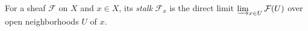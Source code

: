 
For a sheaf $\mathcal F$ on $X$ and $x\in X$, its \emph{stalk} $\mathcal F_x$ is the direct limit $\varinjlim_{x\in U}\mathcal F(U)$ over open neighborhoods $U$ of $x$.
